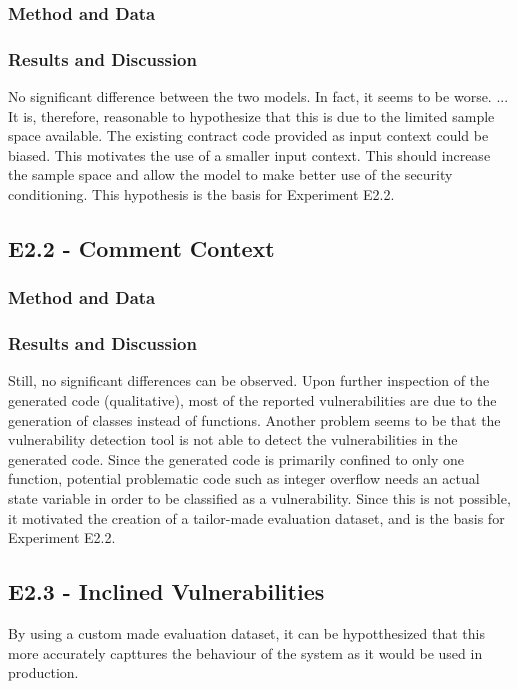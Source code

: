 \subsubsection{Method and Data}
\subsubsection{Results and Discussion}

No significant difference between the two models. In fact, it seems to be worse. ... It is, therefore, reasonable to hypothesize that this is due to the limited sample space available. The existing contract code provided as input context could be biased. This motivates the use of a smaller input context. This should increase the sample space and allow the model to make better use of the security conditioning. This hypothesis is the basis for Experiment E2.2.

\subsection{E2.2 - Comment Context}
\label{sec:e2.2-comment-context}

\subsubsection{Method and Data}

\subsubsection{Results and Discussion}
Still, no significant differences can be observed. Upon further inspection of the generated code (qualitative), most of the reported vulnerabilities are due to the generation of classes instead of functions. Another problem seems to be that the vulnerability detection tool is not able to detect the vulnerabilities in the generated code. Since the generated code is primarily confined to only one function, potential problematic code such as integer overflow needs an actual state variable in order to be classified as a vulnerability. Since this is not possible, it motivated the creation of a tailor-made evaluation dataset, and is the basis for Experiment E2.2.


\subsection{E2.3 - Inclined Vulnerabilities}
\label{sec:e2.3-inclined-vulnerabilities}
By using a custom made evaluation dataset, it can be hypotthesized that this more accurately capttures the behaviour of the system as it would be used in production.

